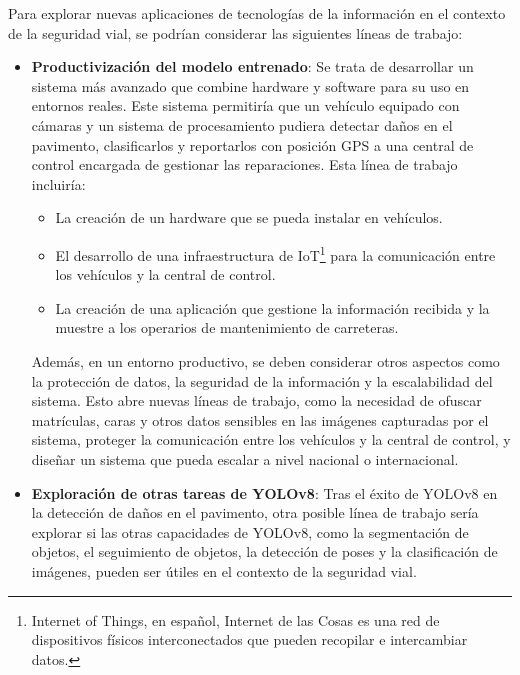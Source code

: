 Para explorar nuevas aplicaciones de tecnologías de la información en el contexto de la seguridad vial, se podrían considerar las siguientes líneas de trabajo:

\begin{itemize}
    \item \textbf{Productivización del modelo entrenado}: Se trata de desarrollar un sistema más avanzado que combine hardware y software para su uso en entornos reales. Este sistema permitiría que un vehículo equipado con cámaras y un sistema de procesamiento pudiera detectar daños en el pavimento, clasificarlos y reportarlos con posición GPS a una central de control encargada de gestionar las reparaciones. Esta línea de trabajo incluiría:
    \begin{itemize}
        \item La creación de un hardware que se pueda instalar en vehículos.
        \item El desarrollo de una infraestructura de IoT\footnote{Internet of Things, en español, Internet de las Cosas es una red de dispositivos físicos interconectados que pueden recopilar e intercambiar datos.} para la comunicación entre los vehículos y la central de control.
        \item La creación de una aplicación que gestione la información recibida y la muestre a los operarios de mantenimiento de carreteras.
    \end{itemize}
    Además, en un entorno productivo, se deben considerar otros aspectos como la protección de datos, la seguridad de la información y la escalabilidad del sistema. Esto abre nuevas líneas de trabajo, como la necesidad de ofuscar matrículas, caras y otros datos sensibles en las imágenes capturadas por el sistema, proteger la comunicación entre los vehículos y la central de control, y diseñar un sistema que pueda escalar a nivel nacional o internacional.
    
    \item \textbf{Exploración de otras tareas de YOLOv8}: Tras el éxito de YOLOv8 en la detección de daños en el pavimento, otra posible línea de trabajo sería explorar si las otras capacidades de YOLOv8, como la segmentación de objetos, el seguimiento de objetos, la detección de poses y la clasificación de imágenes, pueden ser útiles en el contexto de la seguridad vial.
\end{itemize}